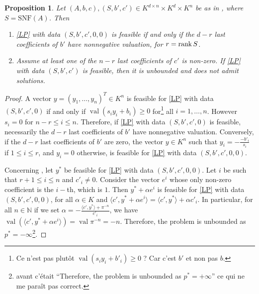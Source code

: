 \documentclass[a4paper,12pt]{article}
\newtheorem{proposition}[theorem]{Proposition}
\newcommand{\simone}[1]{{\color{blue} #1}} %
\newcommand{\corentin}[1]{{\color{red} #1}} %
\DeclareMathOperator{\val}{val}
\begin{document}
\begin{proposition}\label{prop:reduc}
  Let $(A,b,c), (S,b',c') \in K^{d\times n} \times K^d \times K^n$ be as in ,
  where $S = \mathrm{SNF}(A)$. Then
  \begin{enumerate}
  \item \label{prop:reduc_it1}
    \eqref{LP} with data $(S,b',c',0,0)$ is feasible if and only if the $d-r$ last coefficients
    of $b'$ have nonnegative valuation, for $r = {\rm rank}\,S$.
  \item \label{prop:reduc_it2}
    Assume at least one of the $n-r$ last coefficients of $c'$ is non-zero. If \eqref{LP} with
    data $(S,b',c')$ is feasible, then it is unbounded and does not admit solutions.
  \end{enumerate}
\end{proposition}
\begin{proof}
  A vector $y = (y_1, \ldots, y_n)^T \in K^n$ is feasible for \eqref{LP} with data
  $(S,b',c',0)$ if and only if $\val(s_i y_i + b_i) \geq 0$ for\footnote{\simone{Ce n'est pas plutôt $\val(s_i y_i + b'_i) \geq 0$ ? Car c'est $b'$ et non pas $b$.}} all $i = 1,\ldots,n$.
  However $s_i = 0$ for $n-r \leq i\leq n$. Therefore, if \eqref{LP} with data $(S,b',c',0)$ is feasible,
  necessarily the $d-r$ last coefficients of $b'$ have nonnegative valuation.
  Conversely, if the $d-r$ last coefficients of $b'$ are zero, the vector $y \in K^n$ such that
  $y_i = -\frac{-b'_i}{s_i}$ if $1 \leq i \leq r$, and $y_i =0$ otherwise, is feasible for \eqref{LP}
  with data $(S,b',c',0,0)$.

  Concerning , let $y^*$ be feasible for \eqref{LP} with data $(S,b',c',0,0)$.
  Let $i$ be such that $r+1 \leq i \leq n$ and $c'_i \neq 0$. Consider the vector $e^i$ whose only non-zero
  coefficient is the $i-$th, which is $1$. Then $y^* + \alpha e^i$ is feasible for \eqref{LP} with data $(S,b',c',0,0)$,
  for all $\alpha \in K$ and $\langle c', y^* + \alpha e^i\rangle = \langle c' , y^* \rangle + \alpha c'_i$.
  In particular, for all $n \in \mathbb{N}$ if we set $\alpha = -\frac{\langle c', y^* \rangle + \pi^{-n}}{c'_i}$, we have $\val \left( \langle c', y^* + \alpha e ^i \rangle\right) = \val \pi^{-n} = -n$. Therefore, the problem is unbounded as $p^* = -\infty$\footnote{\simone{avant c'était ``Therefore, the problem is unbounded as $p^* = +\infty$'' ce qui ne me paraît pas correct.}}. 
\end{proof}
\end{document}
